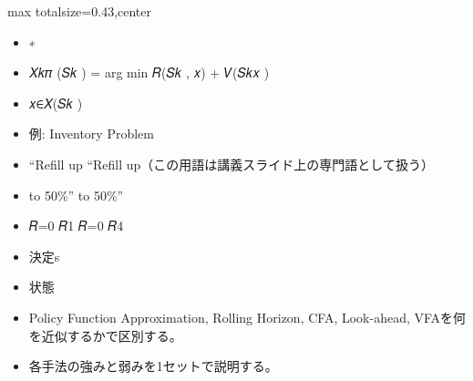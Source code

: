 \clearpage
{}
\begin{minipage}[t]{0.405\textwidth}
\begin{adjustbox}{max totalsize={\textwidth}{0.43\textheight},center}
\begin{minipage}{\textwidth}\scriptsize
{}\begin{itemize}
\item ∗
\item 𝑋𝑘𝜋 (𝑆𝑘 ) = arg min 𝑅(𝑆𝑘 , 𝑥) + 𝑉(𝑆𝑘𝑥 )
\item 𝑥∈𝑋(𝑆𝑘 )
\item 例: Inventory Problem
\item “Refill up “Refill up（この用語は講義スライド上の専門語として扱う）
\item to 50\%” to 50\%”
\item 𝑅=0 𝑅1 𝑅=0 𝑅4
\item 決定s
\item 状態
\end{itemize}\begin{itemize}
\item Policy Function Approximation, Rolling Horizon, CFA, Look-ahead, VFAを何を近似するかで区別する。
\item 各手法の強みと弱みを1セットで説明する。
\end{itemize}
\end{minipage}
\end{adjustbox}
\end{minipage}\hfill
